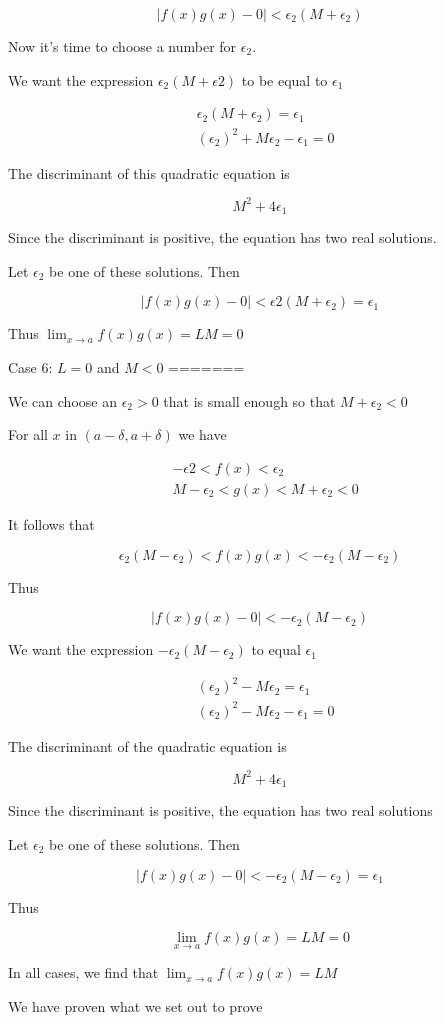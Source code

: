     $$ |f(x)g(x) - 0| < \epsilon_2(M + \epsilon_2) $$

Now it's time to choose a number for $\epsilon_2$.

We want the expression $\epsilon_2(M + \epsilon2)$ to be equal to $\epsilon_1$

\begin{align*}
& \epsilon_2(M + \epsilon_2) = \epsilon_1 \\
& (\epsilon_2)^2 + M\epsilon_2 - \epsilon_1 = 0
\end{align*}

The discriminant of this quadratic equation is

    $$ M^2 + 4\epsilon_1 $$

Since the discriminant is positive, the equation has two real solutions.

Let $\epsilon_2$ be one of these solutions. Then 

    $$ |f(x)g(x) - 0| < \epsilon2(M + \epsilon_2) = \epsilon_1 $$

Thus $\lim_{x \rightarrow a} f(x)g(x) = LM = 0 $

Case 6: $L = 0$ and $M < 0$
=======

We can choose an $\epsilon_2 > 0$ that is small enough so that $M + \epsilon_2 < 0$

For all $x$ in $(a - \delta, a + \delta)$ we have

\begin{align*}
& -\epsilon2 < f(x) < \epsilon_2 \\
& M - \epsilon_2 < g(x) < M + \epsilon_2 < 0
\end{align*}

It follows that

    $$ \epsilon_2(M - \epsilon_2) < f(x)g(x) < -\epsilon_2(M - \epsilon_2) $$

Thus

    $$ |f(x)g(x) - 0| < -\epsilon_2(M - \epsilon_2) $$

We want the expression $-\epsilon_2(M - \epsilon_2)$ to equal $\epsilon_1$

\begin{align*}
& (\epsilon_2)^2 - M\epsilon_2 = \epsilon_1 \\
& (\epsilon_2)^2 - M\epsilon_2 - \epsilon_1 = 0
\end{align*}

The discriminant of the quadratic equation is

    $$ M^2 + 4\epsilon_1 $$

Since the discriminant is positive, the equation has two real solutions

Let $\epsilon_2$ be one of these solutions. Then

    $$ |f(x)g(x) - 0| < -\epsilon_2(M - \epsilon_2) = \epsilon_1 $$

Thus

    $$ \lim_{x \rightarrow a} f(x)g(x) = LM = 0 $$

In all cases, we find that $\lim_{x \rightarrow a} f(x)g(x) = LM$

We have proven what we set out to prove
